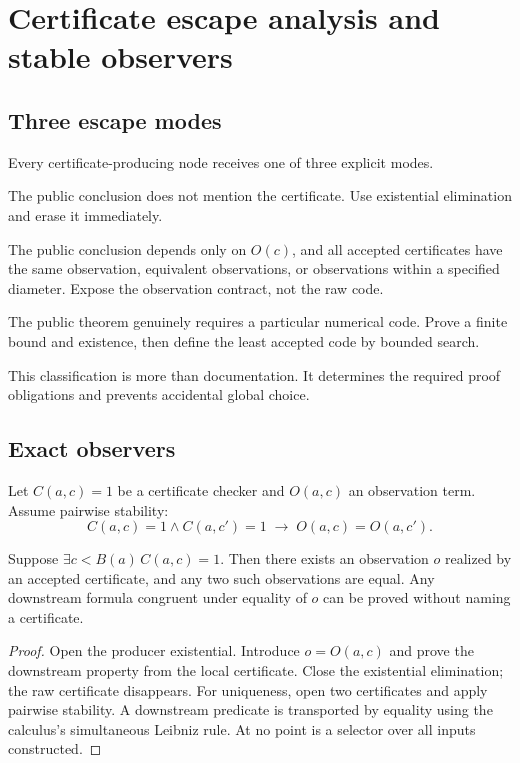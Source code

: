 \section{Certificate escape analysis and stable observers}

\subsection{Three escape modes}

Every certificate-producing node receives one of three explicit modes.

\begin{description}[leftmargin=2.2cm,style=nextline]
\item[Local]
The public conclusion does not mention the certificate.  Use existential
elimination and erase it immediately.

\item[Observed]
The public conclusion depends only on \(O(c)\), and all accepted certificates
have the same observation, equivalent observations, or observations within a
specified diameter.  Expose the observation contract, not the raw code.

\item[Named]
The public theorem genuinely requires a particular numerical code.  Prove a
finite bound and existence, then define the least accepted code by bounded
search.
\end{description}

This classification is more than documentation.  It determines the required
proof obligations and prevents accidental global choice.

\subsection{Exact observers}

Let \(C(a,c)=1\) be a certificate checker and \(O(a,c)\) an observation term.
Assume pairwise stability:
\[
 C(a,c)=1\wedge C(a,c')=1
 \;\longrightarrow\;
 O(a,c)=O(a,c').
\]

\begin{theorem}
Suppose \(\exists c<B(a)\,C(a,c)=1\).  Then there exists an observation \(o\)
realized by an accepted certificate, and any two such observations are equal.
Any downstream formula congruent under equality of \(o\) can be proved without
naming a certificate.
\end{theorem}

\begin{proof}
Open the producer existential.  Introduce \(o=O(a,c)\) and prove the downstream
property from the local certificate.  Close the existential elimination; the
raw certificate disappears.  For uniqueness, open two certificates and apply
pairwise stability.  A downstream predicate is transported by equality using
the calculus's simultaneous Leibniz rule.  At no point is a selector over all
inputs constructed.
\end{proof}

